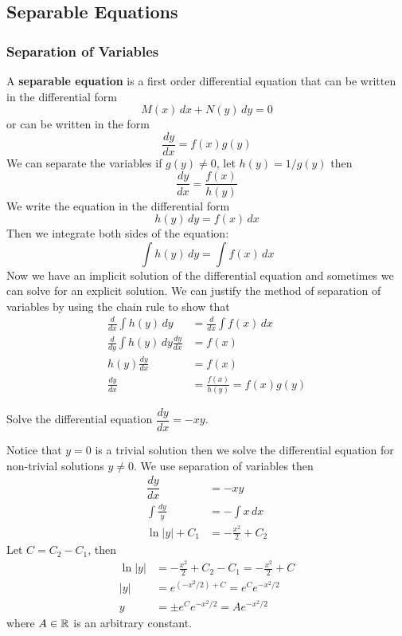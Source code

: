 \subsection{Separable Equations}
\subsubsection{Separation of Variables}
A \textbf{separable equation} is a first order differential equation that can
be written in the differential form
\[M(x)\,dx+N(y)\,dy=0\]
or can be written in the form
\[\frac{dy}{dx}=f(x)g(y)\]
We can separate the variables if \(g(y)\neq0\), let \(h(y)=1/g(y)\) then
\[\frac{dy}{dx}=\frac{f(x)}{h(y)}\]
We write the equation in the differential form
\[h(y)\,dy=f(x)\,dx\]
Then we integrate both sides of the equation:
\[\int h(y)\,dy=\int f(x)\,dx\]
Now we have an implicit solution of the differential equation and sometimes we
can solve for an explicit solution.
We can justify the method of separation of variables by using the chain rule
to show that
\begin{align*}
    \frac{d}{dx}\int h(y)\,dy &= \frac{d}{dx}\int f(x)\,dx \\
    \frac{d}{dy}\int h(y)\,dy\frac{dy}{dx} &= f(x) \\
    h(y)\frac{dy}{dx} &= f(x) \\
    \frac{dy}{dx} &= \frac{f(x)}{h(y)}=f(x)g(y)
\end{align*}
\begin{problem}
    Solve the differential equation \(\dfrac{dy}{dx}=-xy\).
\end{problem}
\begin{solution}
    Notice that \(y=0\) is a trivial solution then we solve the differential
    equation for non-trivial solutions \(y\neq 0\).
    We use separation of variables then
    \begin{align*}
        \dfrac{dy}{dx} &= -xy \\
        \int\frac{dy}{y} &= -\int x\,dx \\
        \ln |y|+C_1 &= -\frac{x^2}{2}+C_2
    \end{align*}
    Let \(C=C_2-C_1\), then
    \begin{align*}
        \ln |y| &= -\frac{x^2}{2}+C_2-C_1=-\frac{x^2}{2}+C \\
        |y| &= e^{(-x^2/2)+C}=e^Ce^{-x^2/2} \\
        y &= \pm e^Ce^{-x^2/2}=Ae^{-x^2/2}
    \end{align*}
    where \(A\in\mathbb{R}\) is an arbitrary constant.
\end{solution}
